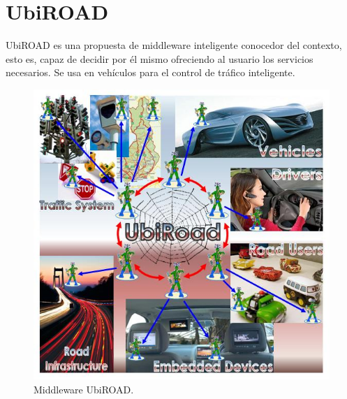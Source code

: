 \documentclass[12pt, twoside]{book}
\begin{document}
\section{UbiROAD}
UbiROAD es una propuesta de middleware inteligente conocedor del contexto, esto es, capaz de decidir por él mismo ofreciendo al usuario los servicios necesarios. Se usa en vehículos para el control de tráfico inteligente. 
 \begin{figure}[H]
\centering
\includegraphics[scale=0.4]{images/ubiroad}
\caption{Middleware UbiROAD.}\label{ubiroad}
\end{figure}
\end{document}
